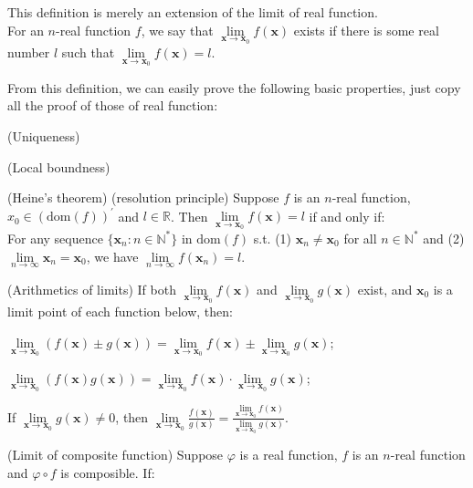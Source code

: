 \documentclass{article}
\begin{document}
\begin{Rmk}{}
    This definition is merely an extension of the limit of real function.\\
    \textcolor{Df}{For an $n$-real function $f$, we say that $\lim\limits_{\pmb{x}\to \pmb{x}_0} f(\pmb{x})$ exists if there is some real number $l$ such that $\lim\limits_{\pmb{x}\to \pmb{x}_0} f(\pmb{x}) = l$.}\\
    \textcolor{Th}{From this definition, we can easily prove the following basic properties, just copy all the proof of those of real function:
    \begin{compactenum}
        \item (Uniqueness)
        \item (Local boundness)
        \item (Heine's theorem) (resolution principle) Suppose $f$ is an $n$-real function, $x_0\in(\text{dom}(f))^\prime$ and $l\in\mathbb{R}$. Then $\lim\limits_{\pmb{x}\rightarrow \pmb{x}_0}f(\pmb{x}) = l$ if and only if:\\
        For any sequence $\{\pmb{x}_n:n\in\mathbb{N^\ast}\}$ in $\text{dom}(f)$ s.t. (1) $\pmb{x}_n\neq \pmb{x}_0$ for all $n\in\mathbb{N^\ast}$ and (2) $\lim\limits_{n\rightarrow\infty}\pmb{x}_n = \pmb{x}_0$, we have $\lim\limits_{n\rightarrow\infty}f(\pmb{x}_n) = l$.
        \item (Arithmetics of limits) If both $\lim\limits_{\pmb{x}\rightarrow \pmb{x}_0} f(\pmb{x})$ and $\lim\limits_{\pmb{x}\rightarrow \pmb{x}_0} g(\pmb{x})$ exist, and $\pmb{x}_0$ is a limit point of each function below, then:
        \begin{compactitem}
            \item $\lim\limits_{\pmb{x}\rightarrow \pmb{x}_0} (f(\pmb{x})\pm g(\pmb{x})) = \lim\limits_{\pmb{x}\rightarrow \pmb{x}_0} f(\pmb{x}) \pm \lim\limits_{\pmb{x}\rightarrow \pmb{x}_0} g(\pmb{x})$;
            \item $\lim\limits_{\pmb{x}\rightarrow \pmb{x}_0} (f(\pmb{x})g(\pmb{x})) = \lim\limits_{\pmb{x}\rightarrow \pmb{x}_0} f(\pmb{x}) \cdot \lim\limits_{\pmb{x}\rightarrow \pmb{x}_0} g(\pmb{x})$;
            \item If $\lim\limits_{\pmb{x}\rightarrow \pmb{x}_0} g(\pmb{x})\neq 0$, then $\lim\limits_{\pmb{x}\rightarrow \pmb{x}_0} \frac{f(\pmb{x})}{g(\pmb{x})} = \frac{\lim\limits_{\pmb{x}\rightarrow \pmb{x}_0} f(\pmb{x})}{\lim\limits_{\pmb{x}\rightarrow \pmb{x}_0} g(\pmb{x})}$.
        \end{compactitem}
        \item (Limit of composite function) Suppose $\varphi$ is a real function, $f$ is an $n$-real function and $\varphi\circ f$ is composible. If:

\end{compactenum}}
\end{Rmk}
\end{document}

